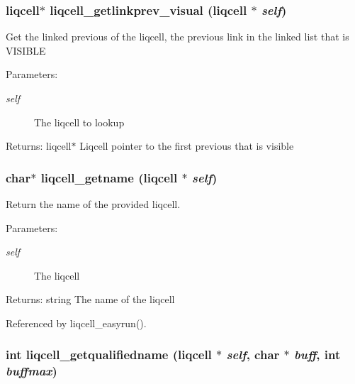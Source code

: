 \subsubsection[{liqcell\_\-getlinkprev\_\-visual}]{\setlength{\rightskip}{0pt plus 5cm}liqcell$\ast$ liqcell\_\-getlinkprev\_\-visual (liqcell $\ast$ {\em self})}\label{d5/da2/liqcell_8c_0a4fb59d363ceadf8864834123c2a622}


Get the linked previous of the liqcell, the previous link in the linked list that is VISIBLE \begin{Desc}
\item[Parameters:]
\begin{description}
\item[{\em self}]The liqcell to lookup \end{description}
\end{Desc}
\begin{Desc}
\item[Returns:]liqcell$\ast$ Liqcell pointer to the first previous that is visible \end{Desc}
\subsubsection[{liqcell\_\-getname}]{\setlength{\rightskip}{0pt plus 5cm}char$\ast$ liqcell\_\-getname (liqcell $\ast$ {\em self})}\label{d5/da2/liqcell_8c_2a3dd9758326dbce471df3ef1bd98711}


Return the name of the provided liqcell. \begin{Desc}
\item[Parameters:]
\begin{description}
\item[{\em self}]The liqcell \end{description}
\end{Desc}
\begin{Desc}
\item[Returns:]string The name of the liqcell \end{Desc}


Referenced by liqcell\_\-easyrun().
\subsubsection[{liqcell\_\-getqualifiedname}]{\setlength{\rightskip}{0pt plus 5cm}int liqcell\_\-getqualifiedname (liqcell $\ast$ {\em self}, \/  char $\ast$ {\em buff}, \/  int {\em buffmax})}\label{d5/da2/liqcell_8c_b6bf85dc93a329d865eaa8fad6374c2d}


